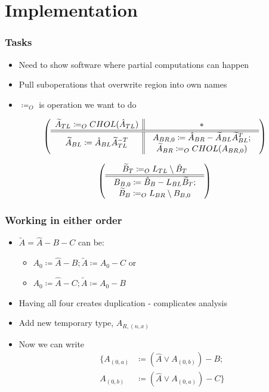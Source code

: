 \documentclass{beamer}
\begin{document}
\section{Implementation}

\frame{\sectionpage}

\begin{frame}
  \frametitle{Tasks}
  \begin{itemize}
  \item Need to show software where partial computations can happen
  \item Pull suboperations that overwrite region into own names
  \item $\coloneqq_O$ is operation we want to do
  \end{itemize}
  \begin{equation*}
    \left( \begin{array}{c || c} \widetilde{A}_{TL} \coloneqq_O CHOL(\hat{A}_{TL}) & * \\ \hline \hline \widetilde{A}_{BL} \coloneqq \hat{A}_{BL}\widetilde{A}_{TL}^{-T} & \begin{array}{c}
       A_{BR, 0} \coloneqq \hat{A}_{BR} - \widetilde{A}_{BL}\widetilde{A}_{BL}^T;\\
       \widetilde{A}_{BR} \coloneqq_O CHOL(A_{BR, 0})
     \end{array} \end{array} \right)
 \end{equation*}

 \begin{equation*}
   \left( \begin{array}{c} \widetilde{B}_T \coloneqq_O L_{TL} \setminus \hat{B}_T \\ \hline \hline \begin{array}{c}
      B_{B, 0} \coloneqq \hat{B}_B - L_{BL}\widetilde{B}_T;\\
      \widetilde{B}_B \coloneqq_O L_{BR} \setminus B_{B, 0}
    \end{array} \end{array} \right)
 \end{equation*}
\end{frame}

\begin{frame}
  \frametitle{Working in either order}
  \begin{itemize}
  \item $\widetilde{A} = \hat{A} - B - C$ can be:
    \begin{itemize}
    \item $A_0 \coloneqq \hat{A} - B; \widetilde{A} \coloneqq A_0 - C$ or
    \item $A_0 \coloneqq \hat{A} - C; \widetilde{A} \coloneqq A_0 - B$
    \end{itemize}

  \item Having all four creates duplication - complicates analysis
  \item Add new temporary type, $A_{R, (n, x)}$
  \item Now we can write
    \begin{align*}
      \{A_{(0, a)} &\coloneqq (\hat{A} \vee A_{(0, b)}) - B;\\
      A_{(0, b)} &\coloneqq (\hat{A} \vee A_{(0, a)}) - C\}
    \end{align*}
  \end{itemize}
\end{frame}
\end{document}
